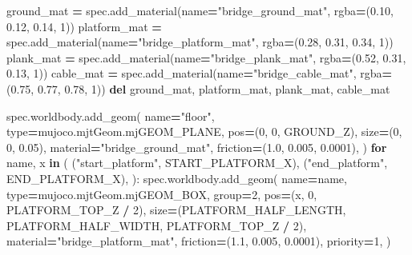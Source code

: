 \documentclass[
  chinese,
  11pt,
  letterpaper,
]{article}
\newenvironment{Shaded}{\begin{snugshade}}{\end{snugshade}}
\newcommand{\BuiltInTok}[1]{#1}
\newcommand{\ControlFlowTok}[1]{\textcolor[rgb]{0.13,0.29,0.53}{\textbf{#1}}}
\newcommand{\DecValTok}[1]{\textcolor[rgb]{0.00,0.00,0.81}{#1}}
\newcommand{\FloatTok}[1]{\textcolor[rgb]{0.00,0.00,0.81}{#1}}
\newcommand{\KeywordTok}[1]{\textcolor[rgb]{0.13,0.29,0.53}{\textbf{#1}}}
\newcommand{\NormalTok}[1]{#1}
\newcommand{\OperatorTok}[1]{\textcolor[rgb]{0.81,0.36,0.00}{\textbf{#1}}}
\newcommand{\StringTok}[1]{\textcolor[rgb]{0.31,0.60,0.02}{#1}}
\renewenvironment{Shaded}{\par\smallskip}{\par\smallskip}
\begin{document}
\begin{Shaded}
\begin{Highlighting}[]
\NormalTok{    ground\_mat }\OperatorTok{=}\NormalTok{ spec.add\_material(name}\OperatorTok{=}\StringTok{"bridge\_ground\_mat"}\NormalTok{, rgba}\OperatorTok{=}\NormalTok{(}\FloatTok{0.10}\NormalTok{, }\FloatTok{0.12}\NormalTok{, }\FloatTok{0.14}\NormalTok{, }\DecValTok{1}\NormalTok{))}
\NormalTok{    platform\_mat }\OperatorTok{=}\NormalTok{ spec.add\_material(name}\OperatorTok{=}\StringTok{"bridge\_platform\_mat"}\NormalTok{, rgba}\OperatorTok{=}\NormalTok{(}\FloatTok{0.28}\NormalTok{, }\FloatTok{0.31}\NormalTok{, }\FloatTok{0.34}\NormalTok{, }\DecValTok{1}\NormalTok{))}
\NormalTok{    plank\_mat }\OperatorTok{=}\NormalTok{ spec.add\_material(name}\OperatorTok{=}\StringTok{"bridge\_plank\_mat"}\NormalTok{, rgba}\OperatorTok{=}\NormalTok{(}\FloatTok{0.52}\NormalTok{, }\FloatTok{0.31}\NormalTok{, }\FloatTok{0.13}\NormalTok{, }\DecValTok{1}\NormalTok{))}
\NormalTok{    cable\_mat }\OperatorTok{=}\NormalTok{ spec.add\_material(name}\OperatorTok{=}\StringTok{"bridge\_cable\_mat"}\NormalTok{, rgba}\OperatorTok{=}\NormalTok{(}\FloatTok{0.75}\NormalTok{, }\FloatTok{0.77}\NormalTok{, }\FloatTok{0.78}\NormalTok{, }\DecValTok{1}\NormalTok{))}
    \KeywordTok{del}\NormalTok{ ground\_mat, platform\_mat, plank\_mat, cable\_mat}

\NormalTok{    spec.worldbody.add\_geom(}
\NormalTok{        name}\OperatorTok{=}\StringTok{"floor"}\NormalTok{,}
        \BuiltInTok{type}\OperatorTok{=}\NormalTok{mujoco.mjtGeom.mjGEOM\_PLANE,}
\NormalTok{        pos}\OperatorTok{=}\NormalTok{(}\DecValTok{0}\NormalTok{, }\DecValTok{0}\NormalTok{, GROUND\_Z),}
\NormalTok{        size}\OperatorTok{=}\NormalTok{(}\DecValTok{0}\NormalTok{, }\DecValTok{0}\NormalTok{, }\FloatTok{0.05}\NormalTok{),}
\NormalTok{        material}\OperatorTok{=}\StringTok{"bridge\_ground\_mat"}\NormalTok{,}
\NormalTok{        friction}\OperatorTok{=}\NormalTok{(}\FloatTok{1.0}\NormalTok{, }\FloatTok{0.005}\NormalTok{, }\FloatTok{0.0001}\NormalTok{),}
\NormalTok{    )}
    \ControlFlowTok{for}\NormalTok{ name, x }\KeywordTok{in}\NormalTok{ (}
\NormalTok{        (}\StringTok{"start\_platform"}\NormalTok{, START\_PLATFORM\_X),}
\NormalTok{        (}\StringTok{"end\_platform"}\NormalTok{, END\_PLATFORM\_X),}
\NormalTok{    ):}
\NormalTok{        spec.worldbody.add\_geom(}
\NormalTok{            name}\OperatorTok{=}\NormalTok{name,}
            \BuiltInTok{type}\OperatorTok{=}\NormalTok{mujoco.mjtGeom.mjGEOM\_BOX,}
\NormalTok{            group}\OperatorTok{=}\DecValTok{2}\NormalTok{,}
\NormalTok{            pos}\OperatorTok{=}\NormalTok{(x, }\DecValTok{0}\NormalTok{, PLATFORM\_TOP\_Z }\OperatorTok{/} \DecValTok{2}\NormalTok{),}
\NormalTok{            size}\OperatorTok{=}\NormalTok{(PLATFORM\_HALF\_LENGTH, PLATFORM\_HALF\_WIDTH, PLATFORM\_TOP\_Z }\OperatorTok{/} \DecValTok{2}\NormalTok{),}
\NormalTok{            material}\OperatorTok{=}\StringTok{"bridge\_platform\_mat"}\NormalTok{,}
\NormalTok{            friction}\OperatorTok{=}\NormalTok{(}\FloatTok{1.1}\NormalTok{, }\FloatTok{0.005}\NormalTok{, }\FloatTok{0.0001}\NormalTok{),}
\NormalTok{            priority}\OperatorTok{=}\DecValTok{1}\NormalTok{,}
\NormalTok{        )}


\end{Highlighting}
\end{Shaded}
\end{document}
